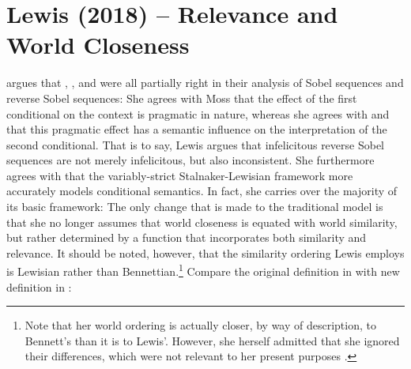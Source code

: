 \section{Lewis (2018) -- Relevance and World Closeness}
\textcite{Lewis2018} argues that \textcite{Fintel2001}, \textcite{Gillies2007}, and \textcite{Moss2012} were all partially right in their analysis of Sobel sequences and reverse Sobel sequences: She agrees with Moss that the effect of the first conditional on the context is pragmatic in nature, whereas she agrees with \textcite{Fintel2001} and \textcite{Gillies2007} that this pragmatic effect has a semantic influence on the interpretation of the second conditional. That is to say, Lewis argues that infelicitous reverse Sobel sequences are not merely infelicitous, but also inconsistent. She furthermore agrees with \textcite{Moss2012} that the variably-strict Stalnaker-Lewisian framework more accurately models conditional semantics. In fact, she carries over the majority of its basic framework: The only change that is made to the traditional model is that she no longer assumes that world closeness is equated with world similarity, but rather determined by a function that incorporates both similarity and relevance. It should be noted, however, that the similarity ordering Lewis employs is Lewisian rather than Bennettian.\footnote{Note that her world ordering is actually closer, by way of description, to Bennett's than it is to Lewis'. However, she herself admitted that she ignored their differences, which were not relevant to her present purposes \parencite[p. 488]{Lewis2018}.}  Compare the original definition in  with  new definition in :

\ex{}
\xe


